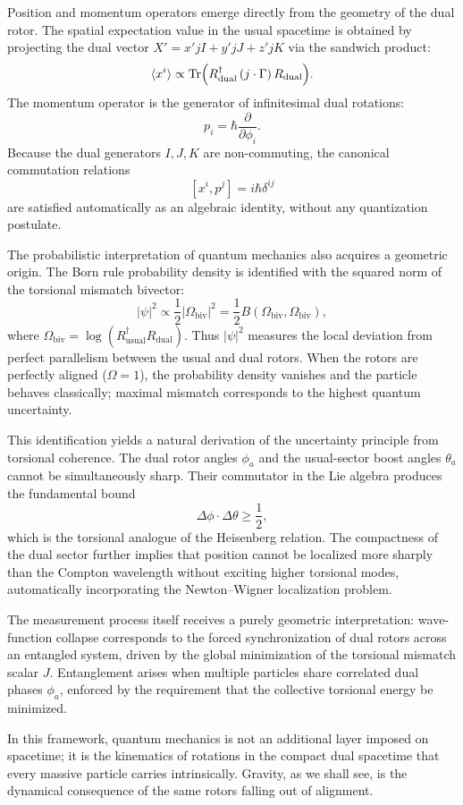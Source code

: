 \documentclass[dvipdfmx,11pt,a4paper]{article}
\begin{document}
Position and momentum operators emerge directly from the geometry of the dual rotor. The spatial expectation value in the usual spacetime is obtained by projecting the dual vector $X' = x' jI + y' jJ + z' jK$ via the sandwich product:
\[
\langle x^i \rangle \propto \operatorname{Tr}\Bigl( R_\text{dual}^\dagger \, (j \cdot \Gamma) \, R_\text{dual} \Bigr).
\]
The momentum operator is the generator of infinitesimal dual rotations:
\[
p_i = \hbar \frac{\partial}{\partial \phi_i}.
\]
Because the dual generators $I, J, K$ are non-commuting, the canonical commutation relations
\[
[x^i, p^j] = i\hbar \delta^{ij}
\]
are satisfied automatically as an algebraic identity, without any quantization postulate.

The probabilistic interpretation of quantum mechanics also acquires a geometric origin. The Born rule probability density is identified with the squared norm of the torsional mismatch bivector:
\[
|\psi|^2 \propto \frac{1}{2} |\Omega_\text{biv}|^2 = \frac{1}{2} B(\Omega_\text{biv}, \Omega_\text{biv}),
\]
where $\Omega_\text{biv} = \log(R_\text{usual}^\dagger R_\text{dual})$. Thus $|\psi|^2$ measures the local deviation from perfect parallelism between the usual and dual rotors. When the rotors are perfectly aligned ($\Omega = 1$), the probability density vanishes and the particle behaves classically; maximal mismatch corresponds to the highest quantum uncertainty.

This identification yields a natural derivation of the uncertainty principle from torsional coherence. The dual rotor angles $\phi_a$ and the usual-sector boost angles $\theta_a$ cannot be simultaneously sharp. Their commutator in the Lie algebra produces the fundamental bound
\[
\Delta\phi \cdot \Delta\theta \geq \frac{1}{2},
\]
which is the torsional analogue of the Heisenberg relation. The compactness of the dual sector further implies that position cannot be localized more sharply than the Compton wavelength without exciting higher torsional modes, automatically incorporating the Newton--Wigner localization problem.

The measurement process itself receives a purely geometric interpretation: wave-function collapse corresponds to the forced synchronization of dual rotors across an entangled system, driven by the global minimization of the torsional mismatch scalar $J$. Entanglement arises when multiple particles share correlated dual phases $\phi_a$, enforced by the requirement that the collective torsional energy be minimized.

In this framework, quantum mechanics is not an additional layer imposed on spacetime; it is the kinematics of rotations in the compact dual spacetime that every massive particle carries intrinsically. Gravity, as we shall see, is the dynamical consequence of the same rotors falling out of alignment.
\end{document}
